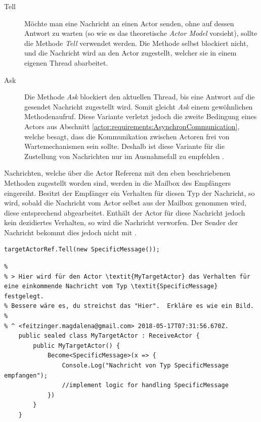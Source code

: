 \begin{description}
    \item[Tell] Möchte man eine Nachricht an einen Actor senden, ohne auf dessen Antwort zu warten (so wie es das theoretische \textit{Actor Model} vorsieht), sollte die Methode \textit{Tell} verwendet werden. Die Methode selbst blockiert nicht, und die Nachricht wird an den Actor zugestellt, welcher sie in einem eigenen Thread abarbeitet. 
% 
% 
    \item[Ask] Die Methode \textit{Ask} blockiert den aktuellen Thread, bis eine Antwort auf die gesendet Nachricht zugestellt wird. Somit gleicht \textit{Ask} einem gewöhnlichen Methodenaufruf. Diese Variante verletzt jedoch die zweite Bedingung eines Actors aus Abschnitt \ref{actor:requirements:AsynchronCommunication}, welche besagt, dass die Kommunikation zwischen Actoren frei von Wartemechanismen sein sollte. Deshalb ist diese Variante für die Zustellung von Nachrichten nur im Ausnahmefall zu empfehlen \citep{Akka.netCommunityAkka.NETDocumentation}.  
\end{description}
Nachrichten, welche über die Actor Referenz mit den eben beschriebenen Methoden zugestellt worden sind, werden in die Mailbox des Empfängers eingereiht. Besitzt der Empfänger ein Verhalten für diesen Typ der Nachricht, so wird, sobald die Nachricht vom Actor selbst aus der Mailbox genommen wird, diese entsprechend abgearbeitet. Enthält der Actor für diese Nachricht jedoch kein de­zi­diertes Verhalten, so wird die Nachricht verworfen. Der Sender der Nachricht bekommt dies jedoch nicht mit \citep{akkaInAction}.  

\begin{lstlisting}[caption=Versenden einer Nachricht an einen anderen Actor, label=code:actor:TellMethod]
    targetActorRef.Tell(new SpecificMessage());
\end{lstlisting}

\begin{lstlisting}[caption=Hier wird für den Actor \textit{MyTargetActor} das Verhalten für eine einkommende Nachricht vom Typ \textit{SpecificMessage} festgelegt., label=lst:test]
% * <feitzinger.magdalena@gmail.com> 2018-05-17T07:27:19.390Z:
% 
% > Hier wird für den Actor \textit{MyTargetActor} das Verhalten für eine einkommende Nachricht vom Typ \textit{SpecificMessage} festgelegt.
% Bessere wäre es, du streichst das "Hier".  Erkläre es wie ein Bild.  
% 
% ^ <feitzinger.magdalena@gmail.com> 2018-05-17T07:31:56.670Z.
    public sealed class MyTargetActor : ReceiveActor {
        public MyTargetActor() {
            Become<SpecificMessage>(x => {
                Console.Log("Nachricht von Typ SpecificMessage empfangen");
                //implement logic for handling SpecificMessage
            })
        }
    }    
\end{lstlisting}

